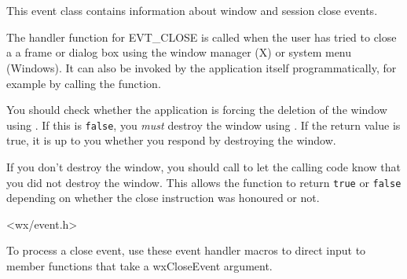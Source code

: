 \section{}\label{wxcloseevent}

This event class contains information about window and session close events.

The handler function for EVT\_CLOSE is called when the user has tried to close a a frame
or dialog box using the window manager (X) or system menu (Windows). It can
also be invoked by the application itself programmatically, for example by
calling the  function.

You should check whether the application is forcing the deletion of the window
using . If this is {\tt false},
you {\it must} destroy the window using .
If the return value is true, it is up to you whether you respond by destroying the window.

If you don't destroy the window, you should call  to
let the calling code know that you did not destroy the window. This allows the  function
to return {\tt true} or {\tt false} depending on whether the close instruction was honoured or not.




<wx/event.h>


To process a close event, use these event handler macros to direct input to member
functions that take a wxCloseEvent argument.

\twocolwidtha{7cm}
\begin{twocollist}\itemsep=0pt
\end{twocollist}%


